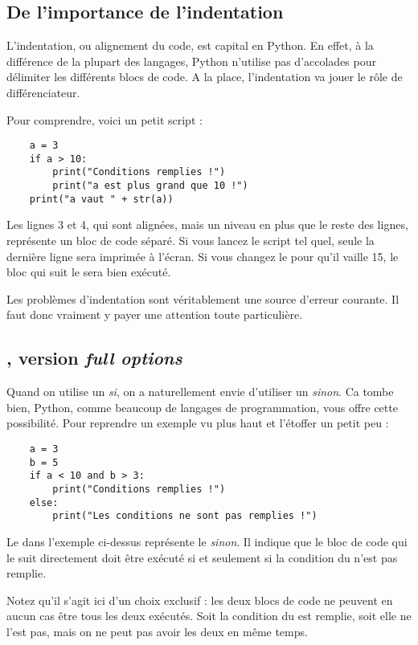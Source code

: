 \subsection{De l'importance de l'indentation}

L'indentation, ou alignement du code, est capital en Python. En effet, à la différence de la plupart des langages, Python n'utilise pas d'accolades pour délimiter les différents blocs de code. A la place, l'indentation va jouer le rôle de différenciateur.

Pour comprendre, voici un petit script :

\begin{lstlisting}
    a = 3
    if a > 10:
        print("Conditions remplies !")
        print("a est plus grand que 10 !")
    print("a vaut " + str(a))
\end{lstlisting}

Les lignes 3 et 4, qui sont alignées, mais un niveau en plus que le reste des lignes, représente un bloc de code séparé. Si vous lancez le script tel quel, seule la dernière ligne sera imprimée à l'écran. Si vous changez le  pour qu'il vaille 15, le bloc qui suit le  sera bien exécuté.

Les problèmes d'indentation sont véritablement une source d'erreur courante. Il faut donc vraiment y payer une attention toute particulière.

\subsection{, version \emph{full options}}

Quand on utilise un \emph{si}, on a naturellement envie d'utiliser un \emph{sinon}. Ca tombe bien, Python, comme beaucoup de langages de programmation, vous offre cette possibilité. Pour reprendre un exemple vu plus haut et l'étoffer un petit peu :

\begin{lstlisting}
    a = 3
    b = 5
    if a < 10 and b > 3:
        print("Conditions remplies !")
    else:
        print("Les conditions ne sont pas remplies !")
\end{lstlisting}

Le  dans l'exemple ci-dessus représente le \emph{sinon}. Il indique que le bloc de code qui le suit directement doit être exécuté si et seulement si la condition du  n'est pas remplie.

Notez qu'il s'agit ici d'un choix exclusif : les deux blocs de code ne peuvent en aucun cas être tous les deux exécutés. Soit la condition du  est remplie, soit elle ne l'est pas, mais on ne peut pas avoir les deux en même temps.

